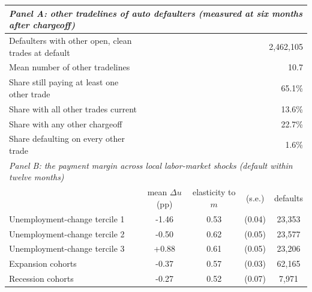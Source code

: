 \begin{tabular}{lcccc}
\toprule
\multicolumn{5}{l}{\emph{Panel A: other tradelines of auto defaulters
(measured at six months after chargeoff)}} \\
\midrule
Defaulters with other open, clean trades at default & \multicolumn{4}{r}{2,462,105} \\
Mean number of other tradelines & \multicolumn{4}{r}{10.7} \\
Share still paying at least one other trade & \multicolumn{4}{r}{65.1\%} \\
Share with all other trades current & \multicolumn{4}{r}{13.6\%} \\
Share with any other chargeoff & \multicolumn{4}{r}{22.7\%} \\
Share defaulting on every other trade & \multicolumn{4}{r}{1.6\%} \\
\midrule
\multicolumn{5}{l}{\emph{Panel B: the payment margin across local labor-market shocks (default within twelve months)}} \\
 & mean $\Delta u$ (pp) & elasticity to $m$ & (s.e.) & defaults \\
\midrule
Unemployment-change tercile 1 & -1.46 & 0.53 & (0.04) & 23,353 \\
Unemployment-change tercile 2 & -0.50 & 0.62 & (0.05) & 23,577 \\
Unemployment-change tercile 3 & +0.88 & 0.61 & (0.05) & 23,206 \\
\addlinespace
Expansion cohorts & -0.37 & 0.57 & (0.03) & 62,165 \\
Recession cohorts & -0.27 & 0.52 & (0.07) & 7,971 \\
\bottomrule
\end{tabular}
